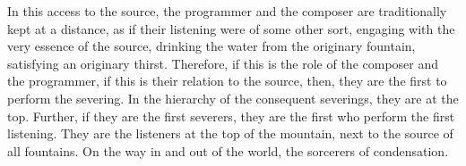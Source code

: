 
In this access to the source, the programmer and the composer are traditionally kept at a distance, as if their listening were of some other sort, engaging with the very essence of the source, drinking the water from the originary fountain, satisfying an originary thirst. Therefore, if this is the role of the composer and the programmer, if this is their relation to the source, then, they are the first to perform the severing. In the hierarchy of the consequent severings, they are at the top. Further, if they are the first severers, they are the first who perform the first listening. They are the listeners at the top of the mountain, next to the source of all fountains. On the way in and out of the world, the sorcerers of condensation.

